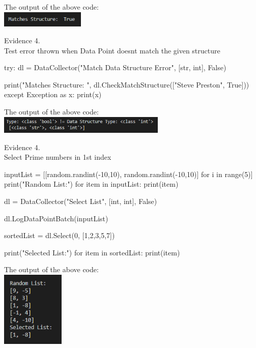 \begin{center}
    The output of the above code: \\
    \includegraphics[width=4cm]{Images/Testing/T4.5.1.PNG} \\
    \vspace{1cm}

    {\large Evidence 4.\rn } \\ 
    \vspace{0.3cm}
    Test error thrown when Data Point doesnt match the given structure \\

    \begin{pythoncode}
try:
dl = DataCollector("Match Data Structure Error", [str, int], False)

print("Matches Structure: ", dl.CheckMatchStructure(["Steve Preston", True]))
except Exception as x:
print(x)
    \end{pythoncode}

    The output of the above code: \\
    \includegraphics[width=8cm]{Images/Testing/T4.6.1.PNG} \\
    \vspace{1cm}

    {\large Evidence 4.\rn } \\ 
    \vspace{0.3cm}
    Select Prime numbers in 1st index\\

    \begin{pythoncode}
inputList = [[random.randint(-10,10), random.randint(-10,10)] for i in range(5)]
print("Random List:")
for item in inputList:
print(item)

dl = DataCollector("Select List", [int, int], False)

dl.LogDataPointBatch(inputList)

sortedList = dl.Select(0, [1,2,3,5,7])

print("Selected List:")
for item in sortedList:
print(item)
    \end{pythoncode}
        
    The output of the above code: \\
    \includegraphics[width=3cm]{Images/Testing/T4.7.1.PNG} \\
    \vspace{1cm}


\end{center}
